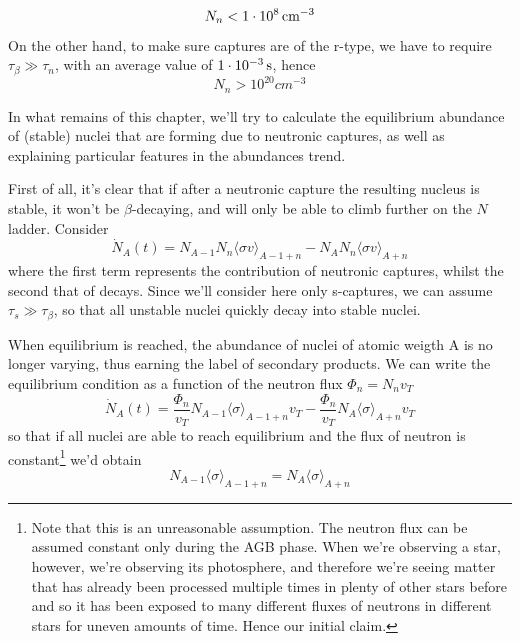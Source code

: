 \begin{equation*}
    N_{n}<1\cdot 10^{8}\,\text{cm}^{-3}
\end{equation*}
On the other hand, to make sure captures are of the r-type, we have to require $\tau_{\beta}\gg\tau_{n}$, with an average value of $1\cdot 10^{-3}\,\text{s}$, hence
\begin{equation*}
    N_{n}> 10^{20}\unit{cm}^{-3}
\end{equation*}
\par In what remains of this chapter, we'll try to calculate the equilibrium abundance of (stable) nuclei that are forming due to neutronic captures, as well as explaining particular features in the abundances trend.
\par First of all, it's clear that if after a neutronic capture the resulting nucleus is stable, it won't be $\beta$-decaying, and will only be able to climb further on the $N$ ladder. Consider
\begin{equation*}
    \dot{N}_{A}(t) = N_{A-1}N_{n}\langle \sigma v \rangle_{A-1+n} - N_{A}N_{n}\langle \sigma v \rangle_{A+n}
\end{equation*}
where the first term represents the contribution of neutronic captures, whilst the second that of decays. Since we'll consider here only s-captures, we can assume $\tau_{s}\gg\tau_{\beta}$, so that all unstable nuclei quickly decay into stable nuclei.
\par When equilibrium is reached, the abundance of nuclei of atomic weigth A is no longer varying, thus earning the label of secondary products. We can write the equilibrium condition as a function of the neutron flux $\Phi_{n} = N_{n}v_{T}$
\begin{equation*}
    \dot{N}_{A}(t) = \frac{\Phi_{n}}{v_{T}}N_{A-1}\langle \sigma \rangle_{A-1+n}v_{T} - \frac{\Phi_{n}}{v_{T}}N_{A}\langle \sigma \rangle_{A+n}v_{T}
\end{equation*}
so that if all nuclei are able to reach equilibrium and the flux of neutron is constant\footnote{Note that this is an unreasonable assumption. The neutron flux can be assumed constant only during the AGB phase. When we're observing a star, however, we're observing its photosphere, and therefore we're seeing matter that has already been processed multiple times in plenty of other stars before and so it has been exposed to many different fluxes of neutrons in different stars for uneven amounts of time. Hence our initial claim.} we'd obtain 
\begin{equation*}
    N_{A-1}\langle\sigma\rangle_{A-1+n} = N_{A}\langle\sigma\rangle_{A+n} 
\end{equation*}
